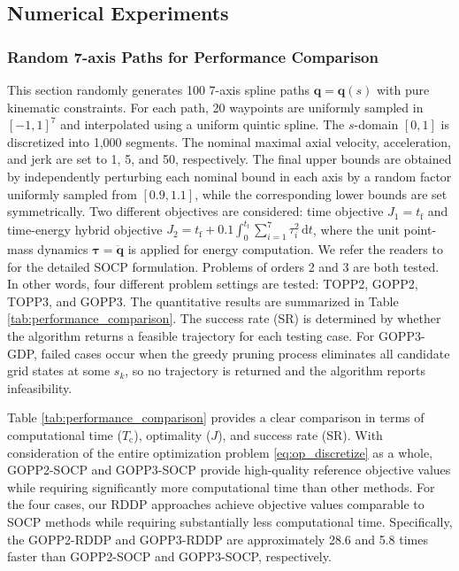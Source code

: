 \documentclass[journal]{IEEEtran}
\theoremstyle{definition}
\theoremstyle{definition}
\renewcommand\vector[1]{\boldsymbol{#1}}
\newcommand\vq{{\vector{q}}}
\newcommand\vtau{{\vector{\tau}}}
\newcommand\RomanNum[1]{\uppercase\expandafter{\romannumeral #1}}
\begin{document}
\subsection{Numerical Experiments}\label{subsec:numerical_experiments}

\subsubsection{Random 7-axis Paths for Performance Comparison}\label{sub2sec:random_7axis_path}

This section randomly generates 100 7-axis spline paths $\vq=\vq(s)$ with pure kinematic constraints. For each path, 20 waypoints are uniformly sampled in $[-1,1]^7$ and interpolated using a uniform quintic spline. The $s$-domain $[0,1]$ is discretized into 1,000 segments. The nominal maximal axial velocity, acceleration, and jerk are set to 1, 5, and 50, respectively. The final upper bounds are obtained by independently perturbing each nominal bound in each axis by a random factor uniformly sampled from $[0.9,1.1]$, while the corresponding lower bounds are set symmetrically. Two different objectives are considered: time objective $J_1=t_\text{f}$ and time-energy hybrid objective $J_2=t_\text{f}+0.1\int_0^{t_\text{f}}\sum_{i=1}^7 \tau_i^2 \, \mathrm{d}t$, where the unit point-mass dynamics $\vtau=\ddot{\vq}$ is applied for energy computation. We refer the readers to \cite[Section \RomanNum{4}--A1]{verscheure2009time} for the detailed SOCP formulation. Problems of orders 2 and 3 are both tested. In other words, four different problem settings are tested: TOPP2, GOPP2, TOPP3, and GOPP3. The quantitative results are summarized in Table \ref{tab:performance_comparison}. The success rate (SR) is determined by whether the algorithm returns a feasible trajectory for each testing case. For GOPP3-GDP, failed cases occur when the greedy pruning process eliminates all candidate grid states at some $s_k$, so no trajectory is returned and the algorithm reports infeasibility.

Table \ref{tab:performance_comparison} provides a clear comparison in terms of computational time ($T_\text{c}$), optimality ($J$), and success rate (SR). With consideration of the entire optimization problem \eqref{eq:op_discretize} as a whole, GOPP2-SOCP and GOPP3-SOCP provide high-quality reference objective values while requiring significantly more computational time than other methods. For the four cases, our RDDP approaches achieve objective values comparable to SOCP methods while requiring substantially less computational time. Specifically, the GOPP2-RDDP and GOPP3-RDDP are approximately 28.6 and 5.8 times faster than GOPP2-SOCP and GOPP3-SOCP, respectively.
\end{document}
